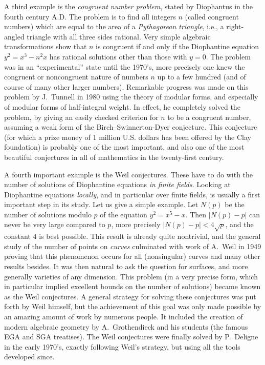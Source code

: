 \documentclass[12pt,a4paper]{article}
\begin{document}
A third example is the \emph{congruent number problem},
stated by Diophantus in the fourth century
A.D. The problem is to find all integers $n$ (called congruent numbers) which 
are equal to the area of a \emph{Pythagorean triangle}, 
i.e., a right-angled triangle with all three 
sides rational. Very simple algebraic transformations show that $n$ is 
congruent if and only if the Diophantine equation
$y^2=x^3-n^2x$ has rational solutions other than those with $y=0$.
The problem was in an ``experimental'' state until the 1970's, more precisely
one knew the congruent or noncongruent nature of numbers $n$ up to a few 
hundred (and of course of many other larger numbers). Remarkable progress was 
made on this problem by J.~Tunnell in 1980 using the 
theory of modular forms, and especially of modular forms of half-integral 
weight. In effect, he completely solved the problem,
by giving an easily checked criterion for $n$ to be a congruent number,
assuming a weak form of the Birch--Swinnerton-Dyer conjecture.
This conjecture (for which a prize money of 1 million U.S. dollars has been 
offered by the Clay foundation) is probably
one of the most important, and also one of the most beautiful conjectures in 
all of mathematics in the twenty-first century.

\medskip

A fourth important example is the Weil conjectures. These have to do with the 
number of solutions
of Diophantine equations \emph{in finite fields}. Looking at Diophantine
equations \emph{locally}, and in particular over finite fields, is usually
a first important step in its study. Let us give a simple example.
Let $N(p)$ be the number of solutions modulo $p$ of the equation
$y^2=x^5-x$. Then $|N(p)-p|$ can never be very large compared to $p$, more
precisely $|N(p)-p|<4\sqrt{p}$, and the constant $4$ is best possible.
This result is already quite nontrivial, and the general study of the number
of points on \emph{curves} culminated with work of A.~Weil in 1949 proving 
that this phenomenon occurs for all (nonsingular) curves and many other
results besides. It was then natural to ask the question for surfaces,
and more generally varieties of any dimension. This problem (in a very precise
form, which in particular implied excellent bounds on the number of solutions)
became known as the Weil conjectures. A general strategy for solving these
conjectures was put forth by Weil himself, but the achievement of this goal
was only made possible by an amazing amount of work by numerous people.
It included the creation of modern algebraic geometry by A.~Grothendieck 
and his students (the famous EGA and SGA treatises). The Weil conjectures were 
finally solved by P.~Deligne in the early 1970's, exactly following Weil's 
strategy, but using all the tools developed since.
\end{document}
